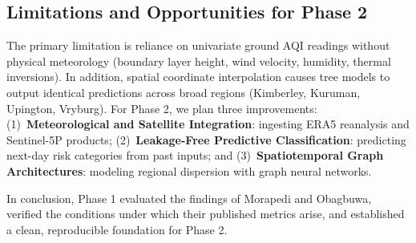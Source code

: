\subsection{Limitations and Opportunities for Phase 2}
The primary limitation is reliance on univariate ground AQI readings without physical meteorology (boundary layer height, wind velocity, humidity, thermal inversions). In addition, spatial coordinate interpolation causes tree models to output identical predictions across broad regions (Kimberley, Kuruman, Upington, Vryburg). For Phase 2, we plan three improvements: (1)~\textbf{Meteorological and Satellite Integration}: ingesting ERA5 reanalysis and Sentinel-5P products; (2)~\textbf{Leakage-Free Predictive Classification}: predicting next-day risk categories from past inputs; and (3)~\textbf{Spatiotemporal Graph Architectures}: modeling regional dispersion with graph neural networks.

In conclusion, Phase 1 evaluated the findings of Morapedi and Obagbuwa, verified the conditions under which their published metrics arise, and established a clean, reproducible foundation for Phase 2.
